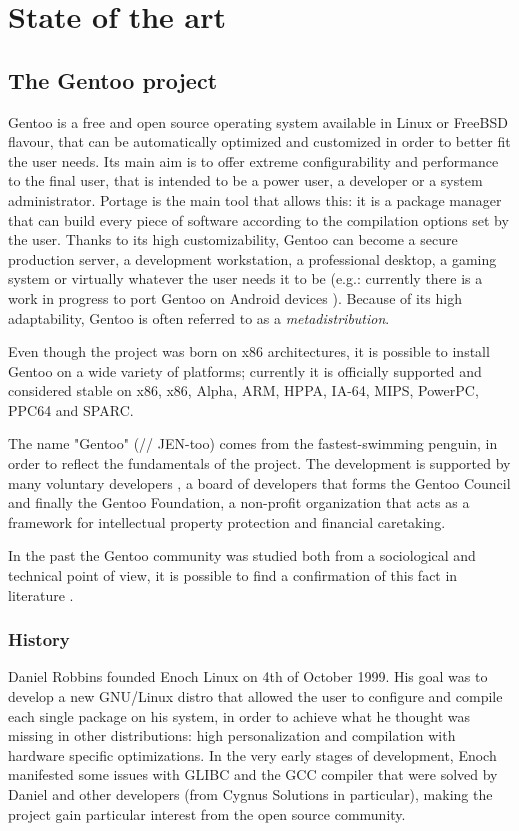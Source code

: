 \chapter{State of the art}

\section{The Gentoo project}
Gentoo is a free and open source operating system available in Linux or FreeBSD flavour, that can be automatically optimized and customized in order to better fit the user needs. Its main aim is to offer extreme configurability and performance to the final user, that is intended to be a power user, a developer or a system administrator. Portage is the main tool that allows this: it is a package manager that can build every piece of software according to the compilation options set by the user.
Thanks to its high customizability, Gentoo can become a secure production server, a development workstation, a professional desktop, a gaming system or virtually whatever the user needs it to be (e.g.: currently there is a work in progress to port Gentoo on Android devices  \cite{gentoo_android}). Because of its high adaptability, Gentoo is often referred to as a \emph{metadistribution}.

Even though the project was born on x86 architectures, it is possible to install Gentoo on a wide variety of platforms; currently it is officially supported and considered stable on x86, x86, Alpha, ARM, HPPA, IA-64, MIPS, PowerPC, PPC64 and SPARC.

The name "Gentoo" (// JEN-too) comes from the fastest-swimming penguin, in order to reflect the fundamentals of the project.
The development is supported by many voluntary developers \cite{gentoo_developers}, a board of developers that forms the Gentoo Council and finally the Gentoo Foundation, a non-profit organization that acts as a framework for intellectual property protection and financial caretaking.

In the past the Gentoo community was studied both from a sociological and technical point of view, it is possible to find a confirmation of this fact in literature \cite{gentoo_book} \cite{gentoo_rise} \cite{gentoo_distributed} \cite{gentoo_ng}.


\subsection{History}
Daniel Robbins founded Enoch Linux on 4th of October 1999. His goal was to develop a new GNU/Linux distro that allowed the user to configure and compile each single package on his system, in order to achieve what he thought was missing in other distributions: high personalization and compilation with hardware specific optimizations.
In the very early stages of development, Enoch manifested some issues with GLIBC and the GCC compiler that were solved by Daniel and other developers (from Cygnus Solutions in particular), making the project gain particular interest from the open source community.

